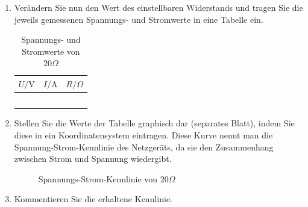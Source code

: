 \begin{enumerate}[$a)$]
\item Verändern Sie nun den Wert des einstellbaren Widerstands und tragen Sie die jeweils gemessenen Spannungs- und Stromwerte in eine Tabelle ein.
\begin{table}[H]
\centering
\begin{tabular}{ccc}\hline
$U/\text{V}$&$I/\text{A}$&$R/\Omega$\\\hline
&&\\
&&\\
&&\\
&&\\
&&\\\hline
\end{tabular}
\caption{Spannungs- und Stromwerte von $20\Omega$}
\end{table}
\item Stellen Sie die Werte der Tabelle graphisch dar (separates Blatt), indem Sie diese in ein Koordinatensystem eintragen. Diese Kurve nennt man die Spannung-Strom-Kennlinie des Netzgeräts, da sie den Zusammenhang zwischen Strom und Spannung wiedergibt. 
\begin{figure}[H]
\centering
{}
\caption{Spannungs-Strom-Kennlinie von $20\Omega$}
\end{figure}
\item Kommentieren Sie die erhaltene Kennlinie.
\end{enumerate}
